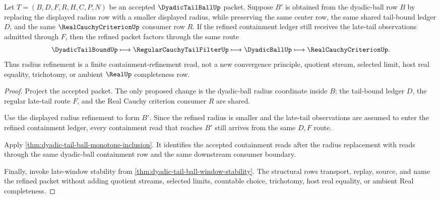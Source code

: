 \begin{theorem}
\label{thm:dyadic-tail-ball-radius-monotonicity}
Let $T=(B,D,F,R,H,C,P,N)$ be an accepted $\DyadicTailBallUp$ packet. Suppose $B'$ is obtained from the dyadic-ball row $B$ by replacing the displayed radius row with a smaller displayed radius, while preserving the same center row, the same shared tail-bound ledger $D$, and the same $\RealCauchyCriterionUp$ consumer row $R$. If the refined containment ledger still receives the late-tail observations admitted through $F$, then the refined packet factors through the same route
$$
\DyadicTailBoundUp \longmapsto \RegularCauchyTailFilterUp \longmapsto \DyadicBallUp \longmapsto \RealCauchyCriterionUp .
$$
Thus radius refinement is a finite containment-refinement read, not a new convergence principle, quotient stream, selected limit, host real equality, trichotomy, or ambient $\RealUp$ completeness row.
\end{theorem}
\begin{proof}
Project the accepted packet. The only proposed change is the dyadic-ball radius coordinate inside $B$; the tail-bound ledger $D$, the regular late-tail route $F$, and the Real Cauchy criterion consumer $R$ are shared.

Use the displayed radius refinement to form $B'$. Since the refined radius is smaller and the late-tail observations are assumed to enter the refined containment ledger, every containment read that reaches $B'$ still arrives from the same $D,F$ route.

Apply \autoref{thm:dyadic-tail-ball-monotone-inclusion}. It identifies the accepted containment reads after the radius replacement with reads through the same dyadic-ball containment row and the same downstream consumer boundary.

Finally, invoke late-window stability from \autoref{thm:dyadic-tail-ball-window-stability}. The structural rows transport, replay, source, and name the refined packet without adding quotient streams, selected limits, countable choice, trichotomy, host real equality, or ambient Real completeness.
\end{proof}

